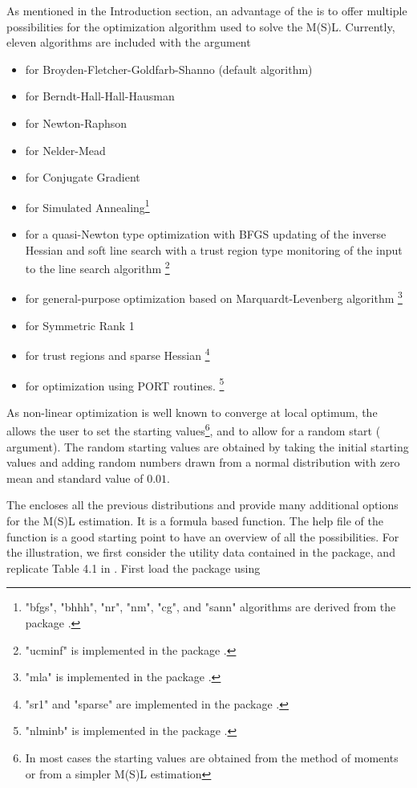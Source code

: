 \documentclass[nojss]{jss}
\begin{document}
As mentioned in the Introduction section, an advantage of the  is to
offer multiple possibilities for the optimization algorithm used to solve the
M(S)L. Currently, eleven algorithms are included with the argument 
%
\begin{itemize} \itemsep 10pt
\item {} for Broyden-Fletcher-Goldfarb-Shanno (default algorithm)
\item {} for Berndt-Hall-Hall-Hausman
\item {} for Newton-Raphson
\item {} for Nelder-Mead
\item {} for Conjugate Gradient
\item {} for Simulated Annealing\footnote{"bfgs", "bhhh", "nr", "nm", 
"cg", and "sann" algorithms are derived from the  package \citep{maxlik}.} 
\item {} for a quasi-Newton type optimization with BFGS updating 
of the inverse Hessian and soft line search with a trust region type monitoring 
of the input to the line search algorithm \footnote{"ucminf" is implemented in 
the  package \citep{ucminf}.}
\item {} for general-purpose optimization based on Marquardt-Levenberg 
algorithm \footnote{"mla" is implemented in 
the  package \citep{mla}.}
\item {} for Symmetric Rank 1 
\item {} for trust regions and sparse Hessian \footnote{"sr1" and 
"sparse" are implemented in the  package \citep{trust}.}
\item {} for optimization using PORT routines. \footnote{"nlminb" 
is implemented in the  package \citep{stats}.}
\end{itemize}
%

As non-linear optimization is well known to converge at local optimum, the
 allows the user to set the starting values\footnote{In most cases the 
starting values are obtained from the method of moments or from a simpler M(S)L 
estimation}, and to allow for a random start ( argument). The
random starting values are obtained by taking the initial starting values and 
adding random numbers drawn from a normal distribution with zero mean and 
standard value of $0.01$.

The  encloses all the previous distributions and provide many 
additional options for the M(S)L estimation. It is a formula based function.
The help file of the function is a good starting point to have an overview of 
all the possibilities. For the illustration, we first consider the utility data 
contained in the package, and replicate Table 4.1 in . 
First load the package using 
\end{document}
